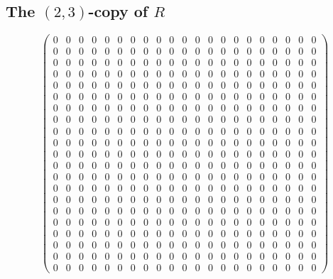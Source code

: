 \documentclass{article}
\begin{document}
\subsection{The $ \left(2, 3\right) $-copy of $R$}
\[ \left(\begin{array}{rrrrrrrrrrrrrrrrrrrrr}
0 & 0 & 0 & 0 & 0 & 0 & 0 & 0 & 0 & 0 & 0 & 0 & 0 & 0 & 0 & 0 & 0 & 0 & 0 & 0 & 0 \\
0 & 0 & 0 & 0 & 0 & 0 & 0 & 0 & 0 & 0 & 0 & 0 & 0 & 0 & 0 & 0 & 0 & 0 & 0 & 0 & 0 \\
0 & 0 & 0 & 0 & 0 & 0 & 0 & 0 & 0 & 0 & 0 & 0 & 0 & 0 & 0 & 0 & 0 & 0 & 0 & 0 & 0 \\
0 & 0 & 0 & 0 & 0 & 0 & 0 & 0 & 0 & 0 & 0 & 0 & 0 & 0 & 0 & 0 & 0 & 0 & 0 & 0 & 0 \\
0 & 0 & 0 & 0 & 0 & 0 & 0 & 0 & 0 & 0 & 0 & 0 & 0 & 0 & 0 & 0 & 0 & 0 & 0 & 0 & 0 \\
0 & 0 & 0 & 0 & 0 & 0 & 0 & 0 & 0 & 0 & 0 & 0 & 0 & 0 & 0 & 0 & 0 & 0 & 0 & 0 & 0 \\
0 & 0 & 0 & 0 & 0 & 0 & 0 & 0 & 0 & 0 & 0 & 0 & 0 & 0 & 0 & 0 & 0 & 0 & 0 & 0 & 0 \\
0 & 0 & 0 & 0 & 0 & 0 & 0 & 0 & 0 & 0 & 0 & 0 & 0 & 0 & 0 & 0 & 0 & 0 & 0 & 0 & 0 \\
0 & 0 & 0 & 0 & 0 & 0 & 0 & 0 & 0 & 0 & 0 & 0 & 0 & 0 & 0 & 0 & 0 & 0 & 0 & 0 & 0 \\
0 & 0 & 0 & 0 & 0 & 0 & 0 & 0 & 0 & 0 & 0 & 0 & 0 & 0 & 0 & 0 & 0 & 0 & 0 & 0 & 0 \\
0 & 0 & 0 & 0 & 0 & 0 & 0 & 0 & 0 & 0 & 0 & 0 & 0 & 0 & 0 & 0 & 0 & 0 & 0 & 0 & 0 \\
0 & 0 & 0 & 0 & 0 & 0 & 0 & 0 & 0 & 0 & 0 & 0 & 0 & 0 & 0 & 0 & 0 & 0 & 0 & 0 & 0 \\
0 & 0 & 0 & 0 & 0 & 0 & 0 & 0 & 0 & 0 & 0 & 0 & 0 & 0 & 0 & 0 & 0 & 0 & 0 & 0 & 0 \\
0 & 0 & 0 & 0 & 0 & 0 & 0 & 0 & 0 & 0 & 0 & 0 & 0 & 0 & 0 & 0 & 0 & 0 & 0 & 0 & 0 \\
0 & 0 & 0 & 0 & 0 & 0 & 0 & 0 & 0 & 0 & 0 & 0 & 0 & 0 & 0 & 0 & 0 & 0 & 0 & 0 & 0 \\
0 & 0 & 0 & 0 & 0 & 0 & 0 & 0 & 0 & 0 & 0 & 0 & 0 & 0 & 0 & 0 & 0 & 0 & 0 & 0 & 0 \\
0 & 0 & 0 & 0 & 0 & 0 & 0 & 0 & 0 & 0 & 0 & 0 & 0 & 0 & 0 & 0 & 0 & 0 & 0 & 0 & 0 \\
0 & 0 & 0 & 0 & 0 & 0 & 0 & 0 & 0 & 0 & 0 & 0 & 0 & 0 & 0 & 0 & 0 & 0 & 0 & 0 & 0 \\
0 & 0 & 0 & 0 & 0 & 0 & 0 & 0 & 0 & 0 & 0 & 0 & 0 & 0 & 0 & 0 & 0 & 0 & 0 & 0 & 0 \\
0 & 0 & 0 & 0 & 0 & 0 & 0 & 0 & 0 & 0 & 0 & 0 & 0 & 0 & 0 & 0 & 0 & 0 & 0 & 0 & 0 \\
0 & 0 & 0 & 0 & 0 & 0 & 0 & 0 & 0 & 0 & 0 & 0 & 0 & 0 & 0 & 0 & 0 & 0 & 0 & 0 & 0
\end{array}\right) \]
\end{document}
